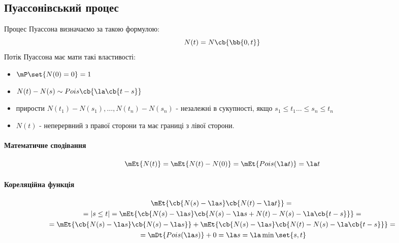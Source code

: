 \subsection{Пуассонівський процес}
Процес Пуассона визначаємо за такою формулою:
\begin{equation}
	N(t) = N\cb{\bb{0,t}}
\end{equation}
Потік Пуассона має мати такі властивості:
\begin{itemize}
	\item $\mP\set{N(0) = 0}=1$ 
	\item $N(t) - N(s) \sim Pois\cb{\la\cb{t-s}}$
	\item прирости $ N(t_1)-N(s_1),\ldots,N(t_n)-N(s_n)$ - незалежні в сукупності, якщо $s_1\leq t_1\ldots\leq s_n\leq t_n$
	\item $N(t)$ - неперервний з правої сторони та має границі з лівої сторони.
\end{itemize}
\paragraph{Математичне сподівання}
\begin{equation}
	\mEt{N(t)} = \mEt{N(t) - N(0)} = \mEt{Pois(\la t)} = \la t 
\end{equation}
\paragraph{Кореляційна функція}
\begin{multline}
	\mEt{\cb{N(s)-\la s}\cb{N(t) - \la t}} ={}\\{}= |s\leq t| = \mEt{\cb{N(s)-\la s}\cb{N(s) - \la s +N(t) - N(s) - \la \cb{t-s}}} ={}\\{}=  \mEt{\cb{N(s)-\la s}\cb{N(s)-\la s}} + \mEt{\cb{N(s)-\la s}\cb{N(t)-N(s)-\la\cb{t-s}}} ={}\\{}= \mDt{Pois(\la s)} + 0 = \la s = \la \min\set{s,t}
\end{multline}

